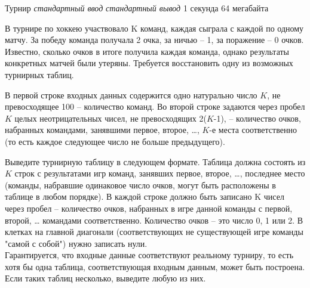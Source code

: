 \begin{problem}%
{Турнир}%
{\textsl{стандартный ввод}}%
{\textsl{стандартный вывод}}%
{1 секунда}%
{64 мегабайта}{}

В турнире по хоккею участвовало K команд, каждая сыграла с каждой по одному матчу. За победу команда получала 2 очка, за ничью – 1, за поражение – 0 очков.\\

Известно, сколько очков в итоге получила каждая команда, однако результаты конкретных матчей были утеряны. Требуется восстановить одну из возможных турнирных таблиц.

\InputFile

В первой строке входных данных содержится одно натурально число $K$, не превосходящее 100 – количество команд. Во второй строке  задаются  через пробел $K$ целых неотрицательных чисел, не превосходящих 2($K$-1), – количество очков, набранных командами, занявшими первое, второе, \dots, $K$-е места соответственно (то есть каждое следующее число не больше предыдущего).

\OutputFile

Выведите турнирную таблицу в следующем формате. Таблица должна состоять из $K$ строк с результатами игр команд, занявших первое, второе, \dots, последнее место (команды, набравшие одинаковое число очков, могут быть расположены в таблице в любом порядке). В каждой строке должно быть записано K чисел через пробел – количество очков, набранных в игре данной команды с первой, второй, … командами соответственно. Количество очков – это число 0, 1 или 2. В клетках на главной диагонали (соответствующих не существующей игре команды "самой с собой") нужно записать нули.\\

Гарантируется, что входные данные соответствуют реальному турниру, то есть хотя бы одна таблица, соответствующая входным данным, может быть построена. Если таких таблиц несколько, выведите любую из них.

\Examples

\begin{example}
%
%
\end{example}
\end{problem}